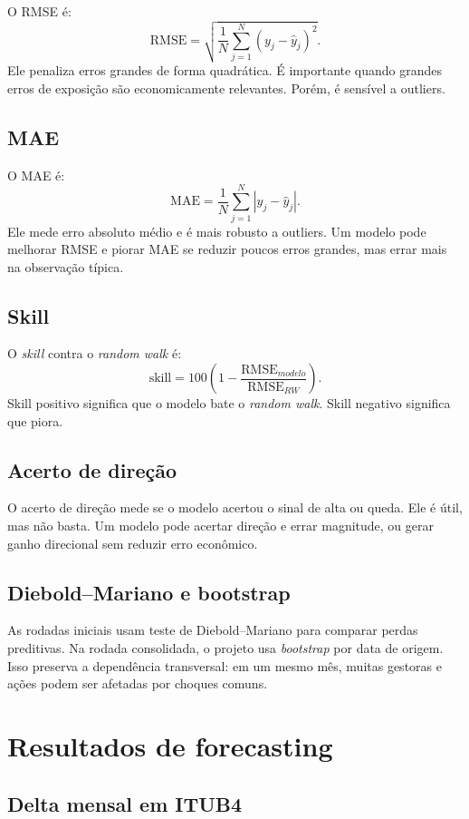 \documentclass[11pt,a4paper]{article}
\begin{document}
O RMSE é:
\[
\text{RMSE}=\sqrt{\frac{1}{N}\sum_{j=1}^N(y_j-\hat{y}_j)^2}.
\]
Ele penaliza erros grandes de forma quadrática. É importante quando grandes erros de exposição são
economicamente relevantes. Porém, é sensível a outliers.

\subsection{MAE}

O MAE é:
\[
\text{MAE}=\frac{1}{N}\sum_{j=1}^N|y_j-\hat{y}_j|.
\]
Ele mede erro absoluto médio e é mais robusto a outliers. Um modelo pode melhorar RMSE e piorar MAE se
reduzir poucos erros grandes, mas errar mais na observação típica.

\subsection{Skill}

O \emph{skill} contra o \emph{random walk} é:
\[
\text{skill}=100\left(1-\frac{\text{RMSE}_{modelo}}{\text{RMSE}_{RW}}\right).
\]
Skill positivo significa que o modelo bate o \emph{random walk}. Skill negativo significa que piora.

\subsection{Acerto de direção}

O acerto de direção mede se o modelo acertou o sinal de alta ou queda. Ele é útil, mas não basta. Um modelo
pode acertar direção e errar magnitude, ou gerar ganho direcional sem reduzir erro econômico.

\subsection{Diebold--Mariano e bootstrap}

As rodadas iniciais usam teste de Diebold--Mariano para comparar perdas preditivas. Na rodada consolidada, o
projeto usa \emph{bootstrap} por data de origem. Isso preserva a dependência transversal: em um mesmo mês,
muitas gestoras e ações podem ser afetadas por choques comuns.

\section{Resultados de forecasting}

\subsection{Delta mensal em ITUB4}
\end{document}
